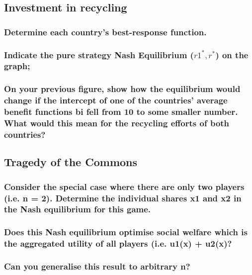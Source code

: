 \documentclass[11pt]{article}
\begin{document}
    \subsection{Investment in recycling}

    \subsubsection{Determine each country’s best-response function.}


    \subsubsection{Indicate the pure strategy Nash Equilibrium ($r1^*,r^*$) on the graph;}

    \subsubsection{On your previous figure, show how the equilibrium would change if the intercept of one of the countries’ average benefit functions bi fell from 10 to some smaller number. What would this mean for the recycling efforts of both countries?}


    \subsection{Tragedy of the Commons}

    \subsubsection{Consider the special case where there are only two players (i.e. n = 2). Determine the individual shares x1 and x2 in the Nash equilibrium for this game.}

    \subsubsection{Does this Nash equilibrium optimise social welfare which is the aggregated utility of all players (i.e. u1(x) + u2(x)?}

    \subsubsection{Can you generalise this result to arbitrary n?}
\end{document}
